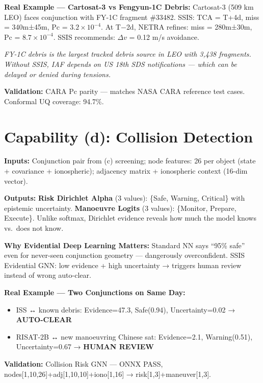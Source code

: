 \documentclass[11pt,a4paper]{article}
\begin{document}
\textbf{Real Example --- Cartosat-3 vs Fengyun-1C Debris:} Cartosat-3 (509 km LEO) faces conjunction with FY-1C fragment \#33482. SSIS: TCA = T+4d, miss = 340m±45m, Pc = $3.2\times10^{-4}$. At T$-$2d, NETRA refines: miss = 280m±30m, Pc = $8.7\times10^{-4}$. SSIS recommends: $\Delta v$ = 0.12 m/s avoidance.

\textit{FY-1C debris is the largest tracked debris source in LEO with 3{,}438 fragments. Without SSIS, IAF depends on US 18th SDS notifications --- which can be delayed or denied during tensions.}

\textbf{Validation:} CARA Pc parity --- matches NASA CARA reference test cases. Conformal UQ coverage: 94.7\%.

\section{Capability (d): Collision Detection}

\textbf{Inputs:} Conjunction pair from (c) screening; node features: 26 per object (state + covariance + ionospheric); adjacency matrix + ionospheric context (16-dim vector).

\textbf{Outputs:} \textbf{Risk Dirichlet Alpha} (3 values): \{Safe, Warning, Critical\} with epistemic uncertainty. \textbf{Manoeuvre Logits} (3 values): \{Monitor, Prepare, Execute\}. Unlike softmax, Dirichlet evidence reveals how much the model knows vs.\ does not know.

\textbf{Why Evidential Deep Learning Matters:} Standard NN says ``95\% safe'' even for never-seen conjunction geometry --- dangerously overconfident. SSIS Evidential GNN: low evidence + high uncertainty → triggers human review instead of wrong auto-clear.

\textbf{Real Example --- Two Conjunctions on Same Day:}
\begin{itemize}[noitemsep]
  \item ISS ↔ known debris: Evidence=47.3, Safe(0.94), Uncertainty=0.02 → \textbf{AUTO-CLEAR}
  \item RISAT-2B ↔ new manoeuvring Chinese sat: Evidence=2.1, Warning(0.51), Uncertainty=0.67 → \textbf{HUMAN REVIEW}
\end{itemize}

\textbf{Validation:} Collision Risk GNN --- ONNX PASS, nodes[1,10,26]+adj[1,10,10]+iono[1,16] → risk[1,3]+maneuver[1,3].

\end{document}
